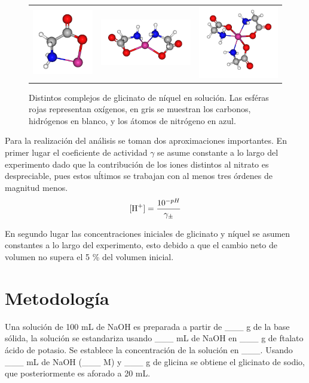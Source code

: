 \documentclass[fleqn,10pt]{SelfArx} %
\begin{document}
	\begin{figure}[h]
		\centering
		\begin{tabular}{ccc}
			\includegraphics[width=0.2\linewidth]{images/Single.png} & \includegraphics[width=0.4\linewidth]{images/Double.png} &
			\includegraphics[width=0.3\linewidth]{images/Triple.png}
		\end{tabular}
		\caption{Distintos complejos de glicinato de n\'iquel en soluci\'on. Las esf\'eras rojas representan ox\'igenos, en gris se muestran los carbonos, hidr\'ogenos en blanco, y los \'atomos de nitr\'ogeno en azul.}
		\label{fig:ligands}
	\end{figure} 
	
	Para la realizaci\'on del an\'alisis se toman dos aproximaciones importantes. En primer lugar el coeficiente de actividad $\gamma$ se asume constante a lo largo del experimento dado que la contribuci\'on de los iones distintos al nitrato es despreciable, pues estos u\'ltimos se trabajan con al menos tres \'ordenes de magnitud menos.
	\begin{equation}
	\ce{[H+]} = \dfrac{10^{-pH}}{\gamma_\pm}
	\end{equation}
	
	En segundo lugar las concentraciones iniciales de glicinato y n\'iquel se asumen constantes a lo largo del experimento, esto debido a que el cambio neto de volumen no supera el 5 \% del volumen inicial.
	
	
	\section{Metodolog\'ia}
	Una soluci\'on de 100 mL de NaOH es preparada a partir de \_\_\_ g de la base s\'olida, la soluci\'on se estandariza usando \_\_\_ mL de NaOH en \_\_\_ g de ftalato \'acido de potasio. Se establece la concentraci\'on de la soluci\'on en \_\_\_. Usando \_\_\_ mL de NaOH (\_\_\_ M) y \_\_\_ g de glicina se obtiene el glicinato de sodio, que posteriormente es aforado a 20 mL.
	
\end{document}
